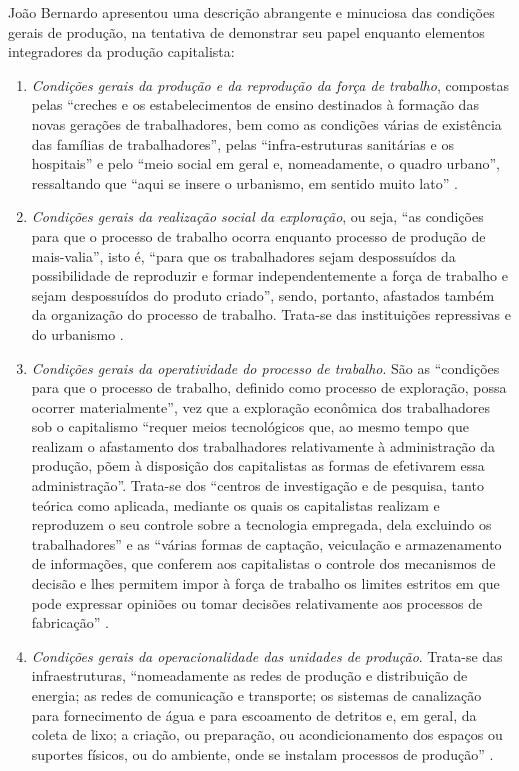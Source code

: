 João Bernardo apresentou uma descrição abrangente e minuciosa das condições gerais de produção, na tentativa de demonstrar seu papel enquanto elementos integradores da produção capitalista:

\begin{enumerate}
\item \textit{Condições gerais da produção e da reprodução da força de trabalho}, compostas pelas ``creches e os estabelecimentos de ensino destinados à formação das novas gerações de trabalhadores, bem como as condições várias de existência das famílias de trabalhadores'', pelas ``infra-estruturas sanitárias e os hospitais'' e pelo ``meio social em geral e, nomeadamente, o quadro urbano'', ressaltando que ``aqui se insere o urbanismo, em sentido muito lato''  \cite[p.~159]{BERNARDO1991}.
\item \textit{Condições gerais da realização social da exploração}, ou seja, ``as condições para que o processo de trabalho ocorra enquanto processo de produção de mais-valia'', isto é, ``para que os trabalhadores sejam despossuídos da possibilidade de reproduzir e formar independentemente a força de trabalho e sejam despossuídos do produto criado'', sendo, portanto, afastados também da organização do processo de trabalho. Trata-se das instituições repressivas e do urbanismo \cite[p.~159]{BERNARDO1991}.
\item \textit{Condições gerais da operatividade do processo de trabalho}. São as ``condições para que o processo de trabalho, definido como processo de exploração, possa ocorrer materialmente'', vez que a exploração econômica dos trabalhadores sob o capitalismo ``requer meios tecnológicos que, ao mesmo tempo que realizam o afastamento dos trabalhadores relativamente à administração da produção, põem à disposição dos capitalistas as formas de efetivarem essa administração''. Trata-se dos ``centros de investigação e de pesquisa, tanto teórica como aplicada, mediante os quais os capitalistas realizam e reproduzem o seu controle sobre a tecnologia empregada, dela excluindo os trabalhadores'' e as ``várias formas de captação, veiculação e armazenamento de informações, que conferem aos capitalistas o controle dos mecanismos de decisão e lhes permitem impor à força de trabalho os limites estritos em que pode expressar opiniões ou tomar decisões relativamente aos processos de fabricação'' \cite[p.~160]{BERNARDO1991}.
\item \textit{Condições gerais da operacionalidade das unidades de produção}. Trata-se das infraestruturas, ``nomeadamente as redes de produção e distribuição de energia; as redes de comunicação e transporte; os sistemas de canalização para fornecimento de água e para escoamento de detritos e, em geral, da coleta de lixo; a criação, ou preparação, ou acondicionamento dos espaços ou suportes físicos, ou do ambiente, onde se instalam processos de produção'' \cite[p.~160-161]{BERNARDO1991}.

\end{enumerate}
